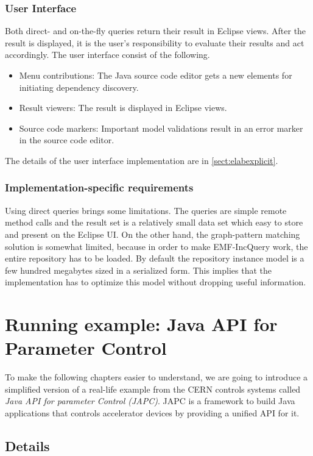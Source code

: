 \subsubsection{User Interface}
Both direct- and on-the-fly queries return their result in Eclipse views. After
the result is displayed, it is the user's responsibility to evaluate their
results and act accordingly. The user interface consist of the following.
\begin{itemize}
  \item Menu contributions: The Java source code editor gets a new elements for 
initiating dependency discovery.
  \item Result viewers: The result is displayed in Eclipse views.
  \item Source code markers: Important model validations result in an error marker 
  in the source code editor.
\end{itemize}
The details of the user interface implementation are in \autoref{sect:elabexplicit}.

\subsubsection{Implementation-specific requirements}
Using direct queries brings some limitations. The queries are simple remote method
calls and the result set is a relatively small data set which easy to store and
present on the Eclipse UI. On the other hand, the graph-pattern matching
solution is somewhat limited, because in order to make EMF-IncQuery work,
the entire repository has to be loaded. By default the repository instance model
is a few hundred megabytes sized in a serialized form. This implies that the
implementation has to optimize this model without dropping useful information.

\section{Running example: Java API for Parameter Control}\label{sect:spf}
To make the following chapters easier to understand, we are going to introduce
a simplified version of a real-life example from the CERN controls systems called
\emph{Java API for parameter Control (JAPC)}\cite{Japc05}.  JAPC is a
framework to build Java applications that controls accelerator devices by
providing a unified API for it. 

\subsection{Details}\label{sect:spfdesc}

